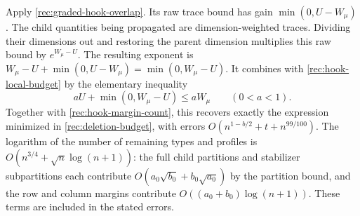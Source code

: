 Apply \eqref{rec:graded-hook-overlap}.  Its raw trace bound has gain
$\min(0,U-W_\mu)$.  The child quantities being propagated are
dimension-weighted traces.  Dividing their dimensions out and
restoring the parent dimension multiplies this raw bound by
$e^{W_\mu-U}$.  The resulting exponent is
$W_\mu-U+\min(0,U-W_\mu)=\min(0,W_\mu-U)$.
It combines with \eqref{rec:hook-local-budget} by the elementary inequality
\[
 aU+\min(0,W_\mu-U)\le aW_\mu\qquad(0<a<1).
\]
Together with \eqref{rec:hook-margin-count}, this recovers exactly
the expression minimized in \eqref{rec:deletion-budget}, with errors
$O(n^{1-b/2}+t+n^{99/100})$. The logarithm of the number of remaining
types and profiles is $O(n^{3/4}+\sqrt n\log(n+1))$: the full child
partitions and stabilizer subpartitions each contribute
$O(a_0\sqrt{b_0}+b_0\sqrt{a_0})$ by the partition bound, and the
row and column margins contribute $O((a_0+b_0)\log(n+1))$.
These terms are included in the stated errors.

